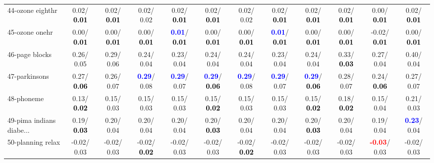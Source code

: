 \begin{table}[h]
\begin{center}
{\begin{tabular}{lc|c|c|c|c|c|c|c|c|c|c}
44-ozone eighthr &   0.02/\textcolor{black}{\textbf{  0.01}} &   0.02/\textcolor{black}{\textbf{  0.01}} &   0.02/  0.02 &   0.02/\textcolor{black}{\textbf{  0.01}} &   0.02/\textcolor{black}{\textbf{  0.01}} &   0.02/  0.02 &   0.02/\textcolor{black}{\textbf{  0.01}} &   0.02/\textcolor{black}{\textbf{  0.01}} &   0.02/\textcolor{black}{\textbf{  0.01}} &   0.00/\textcolor{black}{\textbf{  0.01}} &   0.02/\textcolor{black}{\textbf{  0.01}} \\
45-ozone onehr &   0.00/\textcolor{black}{\textbf{  0.01}} &   0.00/\textcolor{black}{\textbf{  0.01}} &   0.00/\textcolor{black}{\textbf{  0.01}} & \textcolor{blue}{\textbf{  0.01}}/\textcolor{black}{\textbf{  0.01}} &   0.00/\textcolor{black}{\textbf{  0.01}} &   0.00/\textcolor{black}{\textbf{  0.01}} & \textcolor{blue}{\textbf{  0.01}}/\textcolor{black}{\textbf{  0.01}} &   0.00/\textcolor{black}{\textbf{  0.01}} &   0.00/\textcolor{black}{\textbf{  0.01}} &  -0.02/\textcolor{black}{\textbf{  0.01}} &   0.00/\textcolor{black}{\textbf{  0.01}} \\
46-page blocks &   0.26/  0.05 &   0.29/  0.06 &   0.24/  0.04 &   0.23/  0.04 &   0.24/  0.04 &   0.24/  0.04 &   0.23/  0.04 &   0.24/  0.04 &   0.33/\textcolor{black}{\textbf{  0.03}} &   0.27/  0.04 &   0.40/  0.04 \\ \hline
47-parkinsons &   0.27/\textcolor{black}{\textbf{  0.06}} &   0.26/  0.07 & \textcolor{blue}{\textbf{  0.29}}/  0.08 & \textcolor{blue}{\textbf{  0.29}}/  0.07 & \textcolor{blue}{\textbf{  0.29}}/\textcolor{black}{\textbf{  0.06}} & \textcolor{blue}{\textbf{  0.29}}/  0.08 & \textcolor{blue}{\textbf{  0.29}}/  0.07 & \textcolor{blue}{\textbf{  0.29}}/\textcolor{black}{\textbf{  0.06}} &   0.28/  0.07 &   0.24/\textcolor{black}{\textbf{  0.06}} &   0.27/  0.07 \\
48-phoneme &   0.13/\textcolor{black}{\textbf{  0.02}} &   0.15/  0.03 &   0.15/  0.03 &   0.15/  0.03 &   0.15/\textcolor{black}{\textbf{  0.02}} &   0.15/  0.03 &   0.15/  0.03 &   0.15/\textcolor{black}{\textbf{  0.02}} &   0.18/\textcolor{black}{\textbf{  0.02}} &   0.15/  0.04 &   0.21/  0.03 \\
49-pima indians diabe... &   0.19/\textcolor{black}{\textbf{  0.03}} &   0.20/  0.04 &   0.20/  0.04 &   0.20/  0.04 &   0.20/\textcolor{black}{\textbf{  0.03}} &   0.20/  0.04 &   0.20/  0.04 &   0.20/\textcolor{black}{\textbf{  0.03}} &   0.20/  0.04 &   0.19/  0.04 & \textcolor{blue}{\textbf{  0.23}}/  0.04 \\
50-planning relax &  -0.02/  0.03 &  -0.02/  0.03 &  -0.02/\textcolor{black}{\textbf{  0.02}} &  -0.02/  0.03 &  -0.02/  0.03 &  -0.02/\textcolor{black}{\textbf{  0.02}} &  -0.02/  0.03 &  -0.02/  0.03 &  -0.02/  0.03 & \textcolor{red}{\textbf{ -0.03}}/  0.03 &  -0.02/  0.03 \\

\end{tabular}}
\end{center}
\end{table}
